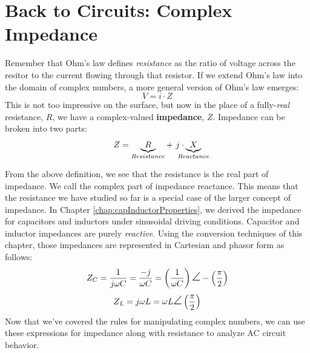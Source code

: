 \section{Back to Circuits: Complex Impedance}
Remember that Ohm's law defines \textit{resistance} as the ratio of voltage across the resitor to the current flowing through that resistor. If we extend Ohm's law into the domain of complex numbers, a more general version of Ohm's law emerges:
$$
V = i \cdot Z
$$
This is not too impressive on the surface, but now in the place of a fully-\textit{real} resistance, $R$, we have a complex-valued \textbf{impedance}, $Z$. Impedance can be broken into two parts:
$$
Z = \underbrace{R}_{Resistance} + \textrm{  } j \cdot \underbrace{X}_{\mathclap{Reactance}}
$$
\par
From the above definition, we see that the resistance is the real part of impedance. We call the complex part of impedance reactance. This means that the resistance we have studied so far is a special case of the larger concept of impedance. In Chapter \ref{chap:capInductorProperties}, we derived the impedance for capacitors and inductors under sinusoidal driving conditions. Capacitor and inductor impedances are purely \textit{reactive}. Using the conversion techniques of this chapter, those impedances are represented in Cartesian and phasor form as follows:
$$
Z_C = \frac{1}{j\omega C} = \frac{-j}{\omega C} = \left(\frac{1}{\omega C}\right)\mathlarger{\mathlarger{\angle}}-\left(\frac{\pi}{2}\right)
$$
$$
Z_L = j\omega L = \omega L\mathlarger{\mathlarger{\angle}}\left(\frac{\pi}{2}\right)
$$
Now that we've covered the rules for manipulating complex numbers, we can use these expressions for impedance along with resistance to analyze AC circuit behavior.


